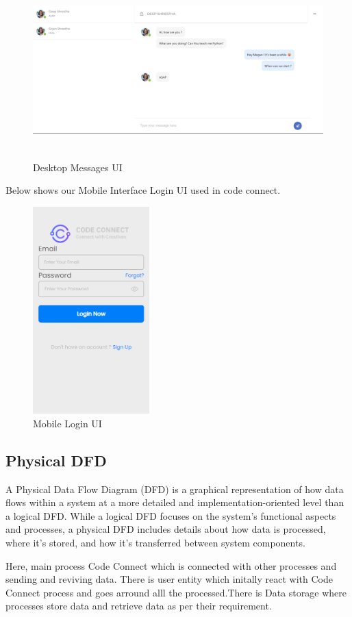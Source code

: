 \begin{figure}[H]
  \centering
  \includegraphics[height = 6.8cm]{ui_diagrams/desktop_messages.png}
  \caption{Desktop Messages UI}
\end{figure}
\newpage
Below shows our Mobile Interface Login UI used in code connect.
\begin{figure}[H]
  \centering
  \includegraphics[height = 8cm]{ui_diagrams/mobile_login.png}
  \caption{Mobile Login UI}
\end{figure}
\newpage
\subsection{Physical DFD}
A Physical Data Flow Diagram (DFD) is a graphical representation of how data flows within a system at a more detailed and implementation-oriented level than a logical DFD. While a logical DFD focuses on the system's functional aspects and processes, a physical DFD includes details about how data is processed, where it's stored, and how it's transferred between system components.

Here, main process Code Connect which is connected with other processes and sending and reviving data. There is user entity which initally react with Code Connect process and goes arround alll the processed.There is Data storage where processes store data and retrieve data as per their requirement.

